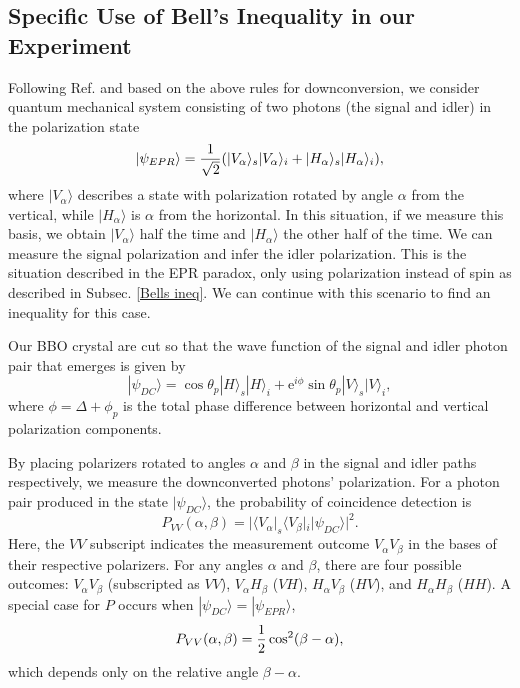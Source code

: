 \documentclass[11pt,letterpaper]{article}
\begin{document}
\subsection{Specific Use of Bell's Inequality in our Experiment} \label{our bell ineq}

Following Ref. \cite{Dehlinger} and based on the above rules for downconversion, we consider quantum mechanical system consisting of two photons (the signal and idler) in the polarization state
\begin{equation}
    |\psi_{EPR} \rangle = {1 \over \sqrt{2}} (|V_\alpha \rangle_s |V_\alpha \rangle_i + |H_\alpha \rangle_s |H_\alpha \rangle_i ) ,
\end{equation}
where $|V_\alpha \rangle$ describes a state with polarization rotated by angle $\alpha$ from the vertical, while $|H_\alpha \rangle$ is $\alpha$ from the horizontal. In this situation, if we measure this basis, we obtain $|V_\alpha \rangle$ half the time and $|H_\alpha \rangle$ the other half of the time. We can measure the signal polarization and infer the idler polarization. This is the situation described in the EPR paradox, only using polarization instead of spin as described in Subsec. \ref{Bells ineq}. We can continue with this scenario to find an inequality for this case.


Our BBO crystal are cut so that the wave function of the signal and idler photon pair that emerges is given by
\begin{equation}
    |\psi_{DC}\rangle = \cos \theta_p |H\rangle_s |H\rangle_i + \mathrm{e}^{i\phi} \sin \theta_p |V\rangle_s |V\rangle_i ,
\end{equation}
where $\phi = \Delta + \phi_p$ is the total phase difference between horizontal and vertical polarization components.

By placing polarizers rotated to angles $\alpha$ and $\beta$ in the signal and idler paths respectively, we measure the downconverted photons' polarization. For a photon pair produced in the state $|\psi_{DC}\rangle$, the probability of coincidence detection is
\begin{equation}
    P_{VV}(\alpha, \beta) = |\langle V_\alpha |_s \langle V_\beta |_i|\psi_{DC}\rangle|^2 .
\end{equation}
Here, the $VV$ subscript indicates the measurement outcome $V_\alpha V_\beta$ in the bases of their respective polarizers. For any angles $\alpha$ and $\beta$, there are four possible outcomes: $V_\alpha V_\beta$ (subscripted as $VV$), $V_\alpha H_\beta$ ($VH$), $H_\alpha V_\beta$ ($HV$), and $H_\alpha H_\beta$ ($HH$). A special case for $P$ occurs when $|\psi_{DC} \rangle = |\psi_{EPR} \rangle$,
\begin{equation}
    P_{VV}(\alpha, \beta) = {1 \over 2} \cos ^2 (\beta - \alpha) , \label{prob coinc}
\end{equation}
which depends only on the relative angle $\beta - \alpha$.
\end{document}
